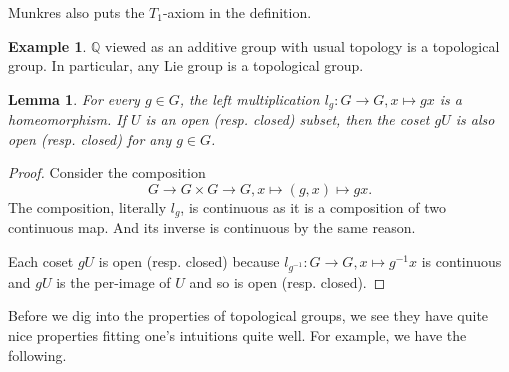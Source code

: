 \documentclass[12pt]{report}
\newtheorem{lemma}[theorem]{Lemma}
\theoremstyle{definition}
\newtheorem{example}[theorem]{Example}
\newcommand{\qq}{\mathbb{Q}}
\begin{document}
\begin{remark}
	Munkres also puts the $T_1$-axiom in the definition.
\end{remark}

\begin{example}
	$\qq$ viewed as an additive group with usual topology is a topological group.
	In particular, any Lie group is a topological group.
\end{example}

\begin{lemma}
	For every $g\in G$, the left multiplication $l_g: G\to G, x\mapsto gx$ is a homeomorphism. If $U$ is an open (resp. closed) subset, then the coset $gU$ is also open (resp. closed) for any $g\in G$.
\end{lemma}

\begin{proof}
	Consider the composition $$G\to G\times G \to G, x\mapsto (g,x)\mapsto gx.$$
	The composition, literally $l_g$, is continuous as it is a composition of two continuous map. And its inverse is continuous by the same reason.

	Each coset $gU$ is open (resp. closed) because $l_{g^{-1}}: G\to G, x\mapsto g^{-1}x$ is continuous and $gU$ is the per-image of $U$ and so is open (resp. closed).
\end{proof}

Before we dig into the properties of topological groups, we see they have quite nice properties fitting one's intuitions quite well. For example, we have the following.
\end{document}
